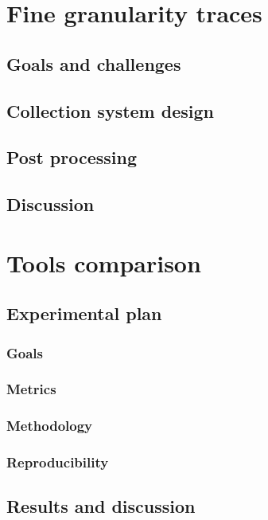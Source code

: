 
\section{Fine granularity traces}

\subsection{Goals and challenges}

\subsection{Collection system design}

\subsection{Post processing}

\subsection{Discussion}

\section{Tools comparison}


\subsection{Experimental plan}

\subsubsection{Goals}
\subsubsection{Metrics}
\subsubsection{Methodology}
\subsubsection{Reproducibility}



\subsection{Results and discussion}


